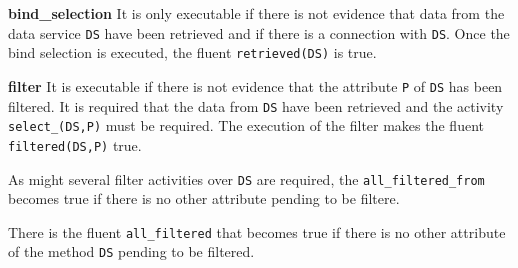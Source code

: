 %


     
\textbf{bind_selection} It is only executable if there is not evidence that data from the data service \texttt{DS} have been retrieved and if there is a connection with \texttt{DS}. Once the bind selection is executed, the fluent \texttt{retrieved(DS)} is true. 

      
%



\textbf{filter} It is executable if there is not evidence that the attribute \texttt{P} of \texttt{DS} has been filtered. It is required that the data from \texttt{DS} have been retrieved and the activity \texttt{select_(DS,P)} must be required. The execution of the filter makes the fluent \texttt{filtered(DS,P)} true.

%



As might several filter activities over \texttt{DS} are required, the \texttt{all_filtered_from} becomes true if there is no other attribute pending to be filtere.

%



There is the fluent \texttt{all\_filtered} that becomes true if there is no other attribute of the method \texttt{DS} pending to be filtered.

%



